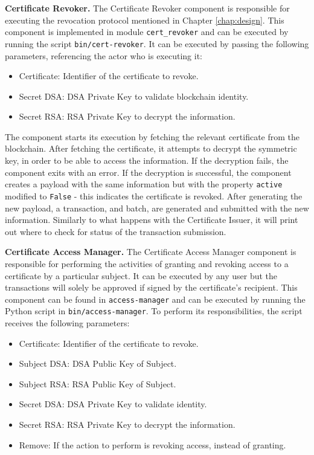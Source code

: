 \textbf{Certificate Revoker.} The Certificate Revoker component is responsible for executing the revocation protocol mentioned in Chapter \ref{chap:design}. This component is implemented in module \texttt{cert\_revoker} and can be executed by running the script \texttt{bin/cert-revoker}. It can be executed by passing the following parameters, referencing the actor who is executing it:

\begin{itemize}
	\item Certificate: Identifier of the certificate to revoke.
	\item Secret DSA: DSA Private Key to validate blockchain identity.
	\item Secret RSA: RSA Private Key to decrypt the information.
\end{itemize}

The component starts its execution by fetching the relevant certificate from the blockchain. After fetching the certificate, it attempts to decrypt the symmetric key, in order to be able to access the information. If the decryption fails, the component exits with an error. If the decryption is successful, the component creates a payload with the same information but with the property \texttt{active} modified to \texttt{False} - this indicates the certificate is revoked. After generating the new payload, a transaction, and batch, are generated and submitted with the new information. Similarly to what happens with the Certificate Issuer, it will print out where to check for status of the transaction submission.

\textbf{Certificate Access Manager.} The Certificate Access Manager component is responsible for performing the activities of granting and revoking access to a certificate by a particular subject. It can be executed by any user but the transactions will solely be approved if signed by the certificate's recipient. This component can be found in \texttt{access-manager} and can be executed by running the Python script in \texttt{bin/access-manager}. To perform its responsibilities, the script receives the following parameters:

\begin{itemize}
	\item Certificate: Identifier of the certificate to revoke.
	\item Subject DSA: DSA Public Key of Subject.
	\item Subject RSA: RSA Public Key of Subject.
	\item Secret DSA: DSA Private Key to validate identity.
	\item Secret RSA: RSA Private Key to decrypt the information.
	\item Remove: If the action to perform is revoking access, instead of granting.
\end{itemize}

